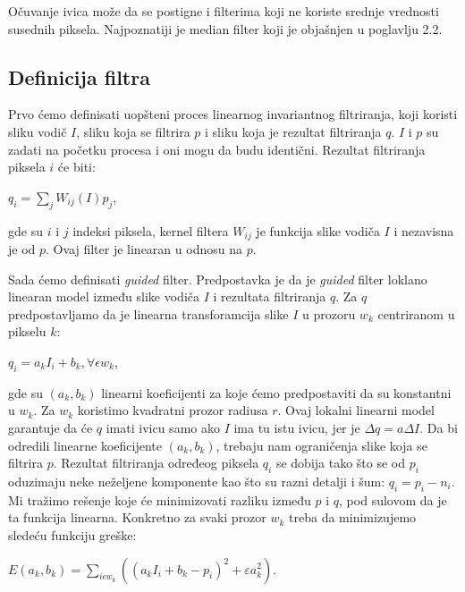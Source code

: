 \documentclass[a4paper,12pt,titlepage]{article}
\begin{document}
Očuvanje ivica može da se postigne i filterima koji ne koriste srednje vrednosti susednih piksela. Najpoznatiji je median filter koji je objašnjen u poglavlju 2.2.           

\subsection{Definicija filtra}%

Prvo ćemo definisati uopšteni proces linearnog invariantnog filtriranja, koji koristi sliku vodič $I$, sliku koja se filtrira $p$ i sliku koja je rezultat filtriranja $q$. $I$ i $p$ su zadati na početku procesa i oni mogu da budu identični. Rezultat filtriranja piksela $i$ će biti: 

\begin{center}
	$q_i = \sum_{j} W_{ij}(I)p_j$,
\end{center}

gde su $i$ i $j$ indeksi piksela, kernel filtera $W_{ij}$ je funkcija slike vodiča $I$ i nezavisna je od $p$. Ovaj filter je linearan u odnosu na $p$. 

Sada ćemo definisati \emph{guided} filter. Predpostavka je da je \emph{guided} filter loklano linearan model između slike vodiča $I$ i rezultata filtriranja $q$. Za $q$ predpostavljamo da je linearna transforamcija slike $I$ u prozoru $w_k$ centriranom u pikselu $k$:

\begin{center}
	$q_i = a_kI_i + b_k, \forall \epsilon w_k$,
\end{center}

gde su $(a_k, b_k)$ linearni koeficijenti za koje ćemo predpostaviti da su konstantni u $w_k$. Za $w_k$ koristimo kvadratni prozor radiusa $r$. Ovaj lokalni linearni model garantuje da će $q$ imati ivicu samo ako $I$ ima tu istu ivicu, jer je $\Delta q = a\Delta I$. Da bi odredili linearne koeficijente $(a_k, b_k)$, trebaju nam ograničenja slike koja se filtrira $p$. Rezultat filtriranja određeog piksela $q_i$ se dobija tako što se od $p_i$ oduzimaju neke neželjene komponente kao što su razni detalji i šum: $q_i = p_i - n_i$. Mi tražimo rešenje koje će minimizovati razliku između $p$ i $q$, pod sulovom da je ta funkcija linearna. Konkretno za svaki prozor $w_k$ treba da minimizujemo sledeću funkciju greške:

\begin{center}
	$E(a_k, b_k) = \sum_{i \epsilon w_k} ((a_kI_i + b_k - p_i)^2 + \varepsilon a_k^2)$.
\end{center}
\end{document}
